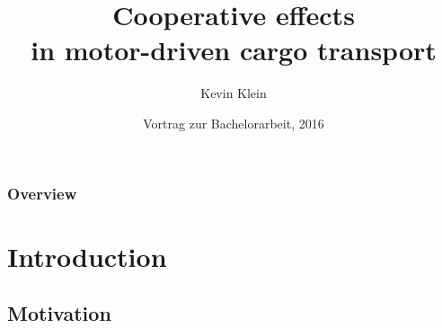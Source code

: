 \documentclass[11pt]{beamer}
\title [Coop. eff. in motor-driven cargo transport] %
{Cooperative effects\\ in motor-driven cargo transport}
\author %
{Kevin Klein}
\institute[Universität des Saarlandes] %
{
Naturwissenschaftlich-Technische Fakultät II \\
- Physik und Mechatronik -  \\
Universität des Saarlandes \\
}
\date[01.12.2016] %
{Vortrag zur Bachelorarbeit, 2016}
\begin{document}
\begin{frame}
  \titlepage
\end{frame}

\begin{frame}
  \frametitle{Overview}
  \tableofcontents
\end{frame}





\section{Introduction}

\subsection{Motivation}
\end{document}
